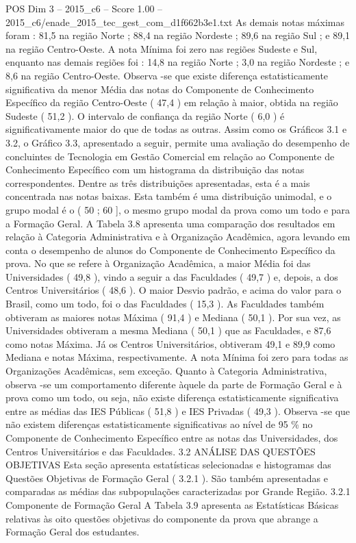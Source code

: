 \begin{textsample}{POS Dim 3 – 2015\_c6 – Score 1.00 – 2015\_c6/enade\_2015\_tec\_gest\_com\_d1f662b3e1.txt}
As demais notas máximas foram : 81,5 na região Norte ; 88,4 na região Nordeste ; 89,6 na região Sul ; e 89,1 na região Centro-Oeste.
A nota Mínima foi zero nas regiões Sudeste e Sul, enquanto nas demais regiões foi : 14,8 na região Norte ; 3,0 na região Nordeste ; e 8,6 na região Centro-Oeste.
Observa -se que existe diferença estatisticamente significativa da menor Média das notas do Componente de Conhecimento Específico da região Centro-Oeste ( 47,4 ) em relação à maior, obtida na região Sudeste ( 51,2 ).
O intervalo de confiança da região Norte ( 6,0 ) é significativamente maior do que de todas as outras.
Assim como os Gráficos 3.1 e 3.2, o Gráfico 3.3, apresentado a seguir, permite uma avaliação do desempenho de concluintes de Tecnologia em Gestão Comercial em relação ao Componente de Conhecimento Específico com um histograma da distribuição das notas correspondentes.
Dentre as três distribuições apresentadas, esta é a mais concentrada nas notas baixas.
Esta também é uma distribuição unimodal, e o grupo modal é o ( 50 ; 60 ], o mesmo grupo modal da prova como um todo e para a Formação Geral.
A Tabela 3.8 apresenta uma comparação dos resultados em relação à Categoria Administrativa e à Organização Acadêmica, agora levando em conta o desempenho de alunos do Componente de Conhecimento Específico da prova.
No que se refere à Organização Acadêmica, a maior Média foi das Universidades ( 49,8 ), vindo a seguir a das Faculdades ( 49,7 ) e, depois, a dos Centros Universitários ( 48,6 ).
O maior Desvio padrão, e acima do valor para o Brasil, como um todo, foi o das Faculdades ( 15,3 ).
As Faculdades também obtiveram as maiores notas Máxima ( 91,4 ) e Mediana ( 50,1 ).
Por sua vez, as Universidades obtiveram a mesma Mediana ( 50,1 ) que as Faculdades, e 87,6 como notas Máxima.
Já os Centros Universitários, obtiveram 49,1 e 89,9 como Mediana e notas Máxima, respectivamente.
A nota Mínima foi zero para todas as Organizações Acadêmicas, sem exceção.
Quanto à Categoria Administrativa, observa -se um comportamento diferente àquele da parte de Formação Geral e à prova como um todo, ou seja, não existe diferença estatisticamente significativa entre as médias das IES Públicas ( 51,8 ) e IES Privadas ( 49,3 ).
Observa -se que não existem diferenças estatisticamente significativas ao nível de 95 \% no Componente de Conhecimento Específico entre as notas das Universidades, dos Centros Universitários e das Faculdades. 3.2 ANÁLISE DAS QUESTÕES OBJETIVAS Esta seção apresenta estatísticas selecionadas e histogramas das Questões Objetivas de Formação Geral ( 3.2.1 ).
São também apresentadas e comparadas as médias das subpopulações caracterizadas por Grande Região. 3.2.1 Componente de Formação Geral A Tabela 3.9 apresenta as Estatísticas Básicas relativas às oito questões objetivas do componente da prova que abrange a Formação Geral dos estudantes.

\end{textsample}
